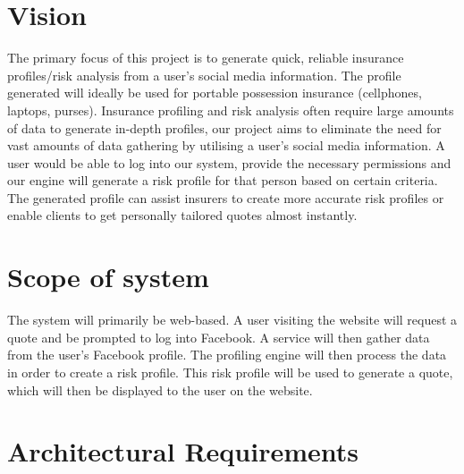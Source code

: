 \documentclass{article}
\begin{document}
\section{Vision}
The primary focus of this project is to generate quick, reliable insurance profiles/risk analysis from a user's social media information. The profile generated will ideally be used for portable possession insurance (cellphones, laptops, purses). Insurance profiling and risk analysis often require large amounts of data to generate in-depth profiles, our project aims to eliminate the need for vast amounts of data gathering by utilising a user's social media information. A user would be able to log into our system, provide the necessary permissions and our engine will generate a risk profile for that person based on certain criteria. The generated profile can assist insurers to create more accurate risk profiles or enable clients to get personally tailored quotes almost instantly.
\section{Scope of system}
The system will primarily be web-based. A user visiting the website will request a quote and be prompted to log into Facebook. A service will then gather data from the user’s Facebook profile. The profiling engine will then process the data in order to create a risk profile. This risk profile will be used to generate a quote, which will then be displayed to the user on the website.

\section{Architectural Requirements}
\end{document}
